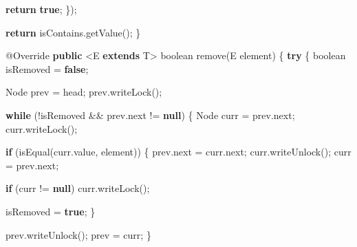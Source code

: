 \documentclass[11pt]{article}
\newenvironment{Shaded}{}{}
\newcommand{\KeywordTok}[1]{\textcolor[rgb]{0.00,0.44,0.13}{\textbf{{#1}}}}
\newcommand{\DataTypeTok}[1]{\textcolor[rgb]{0.56,0.13,0.00}{{#1}}}
\newcommand{\FunctionTok}[1]{\textcolor[rgb]{0.02,0.16,0.49}{{#1}}}
\newcommand{\NormalTok}[1]{{#1}}
\newcommand{\ControlFlowTok}[1]{\textcolor[rgb]{0.00,0.44,0.13}{\textbf{{#1}}}}
\newcommand{\OperatorTok}[1]{\textcolor[rgb]{0.40,0.40,0.40}{{#1}}}
\newcommand{\BuiltInTok}[1]{{#1}}
\newcommand{\AttributeTok}[1]{\textcolor[rgb]{0.49,0.56,0.16}{{#1}}}
\begin{document}
\begin{Shaded}
\begin{Highlighting}[]
            \ControlFlowTok{return} \KeywordTok{true}\OperatorTok{;}
        \OperatorTok{\});}

        \ControlFlowTok{return}\NormalTok{ isContains}\OperatorTok{.}\FunctionTok{getValue}\OperatorTok{();}
    \OperatorTok{\}}

    \AttributeTok{@Override}
    \KeywordTok{public} \OperatorTok{\textless{}}\NormalTok{E }\KeywordTok{extends}\NormalTok{ T}\OperatorTok{\textgreater{}} \DataTypeTok{boolean} \FunctionTok{remove}\OperatorTok{(}\NormalTok{E element}\OperatorTok{)} \OperatorTok{\{}
        \ControlFlowTok{try} \OperatorTok{\{}
            \DataTypeTok{boolean}\NormalTok{ isRemoved }\OperatorTok{=} \KeywordTok{false}\OperatorTok{;}

            \BuiltInTok{Node}\NormalTok{ prev }\OperatorTok{=}\NormalTok{ head}\OperatorTok{;}
\NormalTok{            prev}\OperatorTok{.}\FunctionTok{writeLock}\OperatorTok{();}

            \ControlFlowTok{while} \OperatorTok{(!}\NormalTok{isRemoved }\OperatorTok{\&\&}\NormalTok{ prev}\OperatorTok{.}\FunctionTok{next} \OperatorTok{!=} \KeywordTok{null}\OperatorTok{)} \OperatorTok{\{}
                \BuiltInTok{Node}\NormalTok{ curr }\OperatorTok{=}\NormalTok{ prev}\OperatorTok{.}\FunctionTok{next}\OperatorTok{;}
\NormalTok{                curr}\OperatorTok{.}\FunctionTok{writeLock}\OperatorTok{();}

                \ControlFlowTok{if} \OperatorTok{(}\FunctionTok{isEqual}\OperatorTok{(}\NormalTok{curr}\OperatorTok{.}\FunctionTok{value}\OperatorTok{,}\NormalTok{ element}\OperatorTok{))} \OperatorTok{\{}
\NormalTok{                    prev}\OperatorTok{.}\FunctionTok{next} \OperatorTok{=}\NormalTok{ curr}\OperatorTok{.}\FunctionTok{next}\OperatorTok{;}
\NormalTok{                    curr}\OperatorTok{.}\FunctionTok{writeUnlock}\OperatorTok{();}
\NormalTok{                    curr }\OperatorTok{=}\NormalTok{ prev}\OperatorTok{.}\FunctionTok{next}\OperatorTok{;}

                    \ControlFlowTok{if} \OperatorTok{(}\NormalTok{curr }\OperatorTok{!=} \KeywordTok{null}\OperatorTok{)}
\NormalTok{                        curr}\OperatorTok{.}\FunctionTok{writeLock}\OperatorTok{();}

\NormalTok{                    isRemoved }\OperatorTok{=} \KeywordTok{true}\OperatorTok{;}
                \OperatorTok{\}}

\NormalTok{                prev}\OperatorTok{.}\FunctionTok{writeUnlock}\OperatorTok{();}
\NormalTok{                prev }\OperatorTok{=}\NormalTok{ curr}\OperatorTok{;}
            \OperatorTok{\}}


\end{Highlighting}
\end{Shaded}
\end{document}
